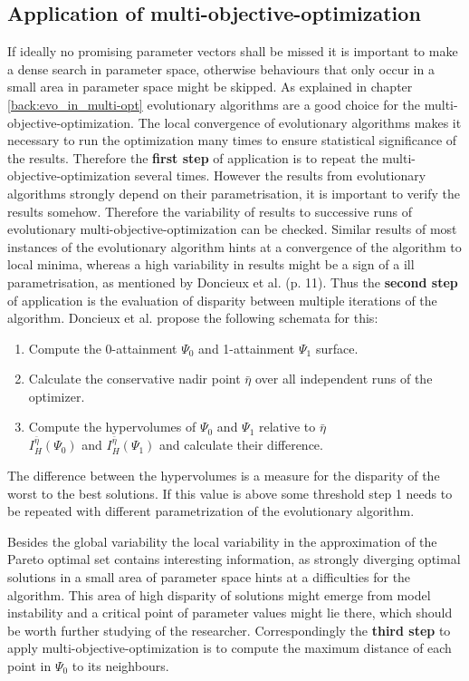 \documentclass[12pt,twoside]{article}
\theoremstyle{plain}
\theoremstyle{definition}
\theoremstyle{remark}
\begin{document}
\subsection{Application of multi-objective-optimization}
If ideally no promising parameter vectors shall be missed it is important to make a dense search in parameter space, otherwise behaviours that only occur in a small area in parameter space might be skipped.
As explained in chapter \ref{back:evo_in_multi-opt} evolutionary algorithms are a good choice for the multi-objective-optimization.
The local convergence of evolutionary algorithms makes it necessary to run the optimization many times to ensure statistical significance of the results. Therefore the \textbf{first step} of application is to repeat the multi-objective-optimization several times.
However the results from evolutionary algorithms strongly depend on their parametrisation, it is important to verify the results somehow.
Therefore the variability of results to successive runs of evolutionary multi-objective-optimization can be checked. Similar results of most instances of the evolutionary algorithm hints at a convergence of the algorithm to local minima, whereas a high variability in results might be a sign of a ill parametrisation, as mentioned by Doncieux et al. \cite{doncieux2015multi} (p. 11).
Thus the \textbf{second step} of application is the evaluation of disparity between multiple iterations of the algorithm. Doncieux et al. propose the following schemata for this:
\begin{enumerate}
	\item Compute the 0-attainment $\Psi_0$ and 1-attainment $\Psi_1$ surface.
	\item Calculate the conservative nadir point $\bar{\eta}$ over all independent runs of the optimizer.
	\item Compute the hypervolumes of $\Psi_0$ and $\Psi_1$ relative to $\bar{\eta}$\\ $I^{\bar{\eta}}_H(\Psi_0)$ and $I^{\bar{\eta}}_H(\Psi_1)$ and calculate their difference.
\end{enumerate}
The difference between the hypervolumes is a measure for the disparity of the worst to the best solutions. If this value is above some threshold step 1 needs to be repeated with different parametrization of the evolutionary algorithm.

Besides the global variability the local variability in the approximation of the Pareto optimal set contains interesting information, as strongly diverging optimal solutions in a small area of parameter space hints at a difficulties for the algorithm.
This area of high disparity of solutions might emerge from model instability and a critical point of parameter values might lie there, which should be worth further studying of the researcher.
Correspondingly the \textbf{third step} to apply multi-objective-optimization is to compute the maximum distance of each point in $\Psi_0$ to its neighbours.
\end{document}
